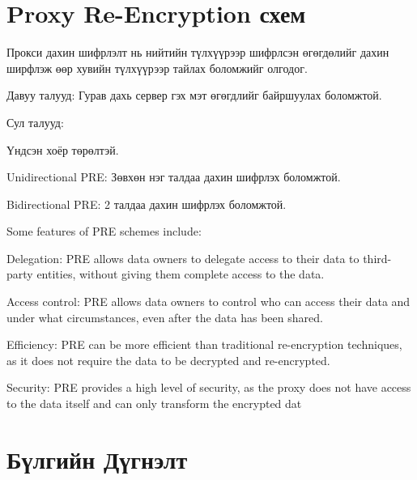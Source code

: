 
\section{Proxy Re-Encryption схем}

Прокси дахин шифрлэлт нь нийтийн түлхүүрээр шифрлсэн өгөгдөлийг дахин ширфлэж өөр хувийн түлхүүрээр тайлах боломжийг олгодог.

Давуу талууд:
Гурав дахь сервер гэх мэт өгөгдлийг байршуулах боломжтой.

Сул талууд:

Үндсэн хоёр төрөлтэй.

Unidirectional PRE: Зөвхөн нэг талдаа дахин шифрлэх боломжтой.

Bidirectional PRE: 2 талдаа дахин шифрлэх боломжтой.

Some features of PRE schemes include:

Delegation: PRE allows data owners to delegate access to their data to third-party entities, without giving them complete access to the data.

Access control: PRE allows data owners to control who can access their data and under what circumstances, even after the data has been shared.

Efficiency: PRE can be more efficient than traditional re-encryption techniques, as it does not require the data to be decrypted and re-encrypted.

Security: PRE provides a high level of security, as the proxy does not have access to the data itself and can only transform the encrypted dat


\section{Бүлгийн Дүгнэлт}
